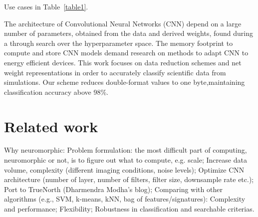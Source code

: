 Use cases in Table~\ref{table1}.

The architecture of Convolutional Neural Networks (CNN) depend on a
large number of parameters, obtained from the data and derived weights,
found during a through search over the hyperparameter space. The
memory footprint to compute and store CNN models demand research
on methods to adapt CNN to energy efficient devices. This work focuses
on data reduction schemes and net weight representations in order to
accurately classify scientific data from simulations. Our scheme reduces
double-format values to one byte,maintaining classification accuracy
above 98\%.



\section{Related work}
Why neuromorphic:
Problem formulation: the most difficult part of computing, neuromorphic or not, is to figure out what to compute, e.g. scale;
Increase data volume, complexity (different imaging conditions, noise levels);
Optimize CNN architecture (number of layer, number of filters, filter size, downsample rate etc.);
Port to TrueNorth (Dharmendra Modha’s blog);
Comparing with other algorithms (e.g., SVM, k-means, kNN, bag of features/signatures):
Complexity and performance;
Flexibility;
Robustness in classification and searchable criterias.
